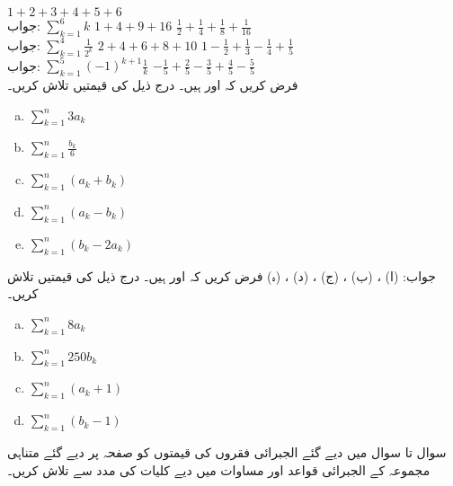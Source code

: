 $1+2+3+4+5+6$\\
جواب:\quad
$\sum\limits_{k=1}^6k$
$1+4+9+16$
$\tfrac{1}{2}+\tfrac{1}{4}+\tfrac{1}{8}+\tfrac{1}{16}$\\
جواب:\quad
$\sum\limits_{k=1}^4\tfrac{1}{2^k}$
$2+4+6+8+10$
$1-\tfrac{1}{2}+\tfrac{1}{3}-\tfrac{1}{4}+\tfrac{1}{5}$\\
جواب:\quad
$\sum\limits_{k=1}^5(-1)^{k+1}\tfrac{1}{k}$
$-\tfrac{1}{5}+\tfrac{2}{5}-\tfrac{3}{5}+\tfrac{4}{5}-\tfrac{5}{5}$
\\
فرض کریں کہ  اور  ہیں۔ درج ذیل کی قیمتیں تلاش کریں۔
\begin{multicols}{3}
\begin{enumerate}[a.]
\item
$\sum\limits_{k=1}^n 3a_k$
\item
$\sum\limits_{k=1}^n\tfrac{b_k}{6}$
\item
$\sum\limits_{k=1}^n (a_k+b_k)$
\item
$\sum\limits_{k=1}^n(a_k-b_k)$
\item
$\sum\limits_{k=1}^n(b_k-2a_k)$
\end{enumerate}
\end{multicols}
جواب:\quad
(ا) ، (ب) ، (ج) ، (د) ، (ہ) 
فرض کریں کہ  اور  ہیں۔ درج ذیل کی قیمتیں تلاش کریں۔
\begin{multicols}{4}
\begin{enumerate}[a.]
\item
$\sum\limits_{k=1}^n 8a_k$
\item
$\sum\limits_{k=1}^n250b_k$
\item
$\sum\limits_{k=1}^n(a_k+1)$
\item
$\sum\limits_{k=1}^n(b_k-1)$
\end{enumerate}
\end{multicols}
سوال  تا سوال  میں دیے گئے الجبرائی فقروں کی قیمتوں کو صفحہ  پر دیے گئے متناہی مجموعہ کے  الجبرائی قواعد اور مساوات  میں دیے کلیات کی مدد سے تلاش کریں۔
 
